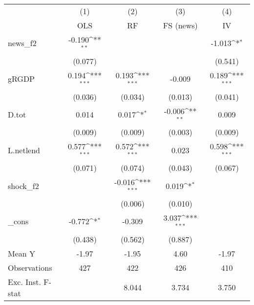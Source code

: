 {
\def\sym#1{\ifmmode^{#1}\else\(^{#1}\)\fi}
\begin{tabular}{l*{4}{c}}
\toprule
            &\multicolumn{1}{c}{(1)}&\multicolumn{1}{c}{(2)}&\multicolumn{1}{c}{(3)}&\multicolumn{1}{c}{(4)}\\
            &\multicolumn{1}{c}{OLS}&\multicolumn{1}{c}{RF}&\multicolumn{1}{c}{FS (news)}&\multicolumn{1}{c}{IV}\\
\midrule
news\_f2     &      -0.190\sym{**} &                     &                     &      -1.013\sym{*}  \\
            &     (0.077)         &                     &                     &     (0.541)         \\
\addlinespace
gRGDP       &       0.194\sym{***}&       0.193\sym{***}&      -0.009         &       0.189\sym{***}\\
            &     (0.036)         &     (0.034)         &     (0.013)         &     (0.041)         \\
\addlinespace
D.tot       &       0.014         &       0.017\sym{*}  &      -0.006\sym{**} &       0.009         \\
            &     (0.009)         &     (0.009)         &     (0.003)         &     (0.009)         \\
\addlinespace
L.netlend   &       0.577\sym{***}&       0.572\sym{***}&       0.023         &       0.598\sym{***}\\
            &     (0.071)         &     (0.074)         &     (0.043)         &     (0.067)         \\
\addlinespace
shock\_f2    &                     &      -0.016\sym{***}&       0.019\sym{*}  &                     \\
            &                     &     (0.006)         &     (0.010)         &                     \\
\addlinespace
\_cons      &      -0.772\sym{*}  &      -0.309         &       3.037\sym{***}&                     \\
            &     (0.438)         &     (0.562)         &     (0.887)         &                     \\
\midrule
Mean Y      &       -1.97         &       -1.95         &        4.60         &       -1.97         \\
Observations&         427         &         422         &         426         &         410         \\
Exc. Inst. F-stat&                     &       8.044         &       3.734         &       3.750         \\
\bottomrule
\end{tabular}
}
